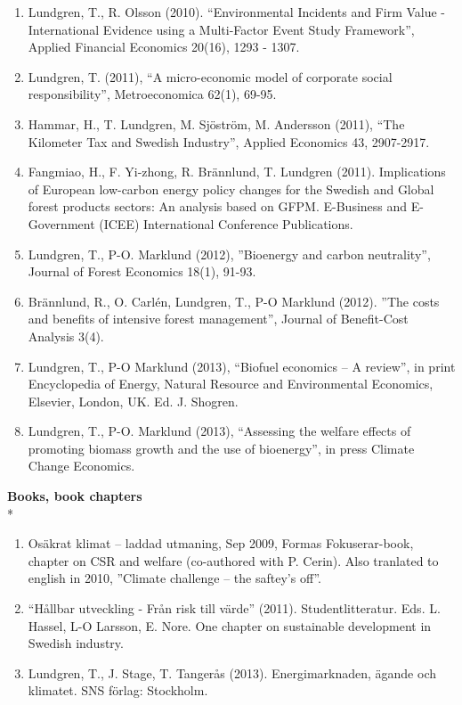 \begin{enumerate}
	\item Lundgren, T., R. Olsson (2010). “Environmental Incidents and Firm Value - International Evidence using a Multi-Factor Event Study Framework”, Applied Financial Economics 20(16), 1293 - 1307.
	\item Lundgren, T. (2011), “A micro-economic model of corporate social responsibility”, Metroeconomica  62(1), 69-95.
	\item Hammar, H., T. Lundgren, M. Sjöström, M. Andersson (2011), “The Kilometer Tax and Swedish Industry”, Applied Economics 43, 2907-2917.
	\item Fangmiao, H., F. Yi-zhong, R. Brännlund, T. Lundgren (2011). Implications of European low-carbon energy policy changes for the Swedish and Global forest products sectors: An analysis based on GFPM. E-Business and E-Government (ICEE) International Conference Publications.
	\item Lundgren, T., P-O. Marklund (2012), ”Bioenergy and carbon neutrality”, Journal of Forest Economics 18(1), 91-93.
	\item Brännlund, R., O. Carlén, Lundgren, T., P-O Marklund (2012). ”The costs and benefits of intensive forest management”, Journal of Benefit-Cost Analysis 3(4).
	\item Lundgren, T., P-O Marklund (2013), “Biofuel economics – A review”, in print Encyclopedia of Energy, Natural Resource and Environmental Economics, Elsevier,
London, UK. Ed. J. Shogren.
	\item Lundgren, T., P-O. Marklund (2013), “Assessing the welfare effects of promoting biomass growth and the use of bioenergy”, in press Climate Change Economics.
\end{enumerate}

\textbf{Books, book chapters}\\*
\begin{enumerate}
	\item Osäkrat klimat – laddad utmaning, Sep 2009, Formas Fokuserar-book, chapter on CSR and welfare (co-authored with P. Cerin). Also tranlated to english in 2010, ”Climate challenge – the saftey’s off”.
	\item “Hållbar utveckling - Från risk till värde” (2011). Studentlitteratur. Eds. L. Hassel, L-O Larsson, E. Nore. One chapter on sustainable development in Swedish industry.
	\item Lundgren, T., J. Stage, T. Tangerås (2013). Energimarknaden, ägande och klimatet. SNS förlag: Stockholm.
\end{enumerate}

